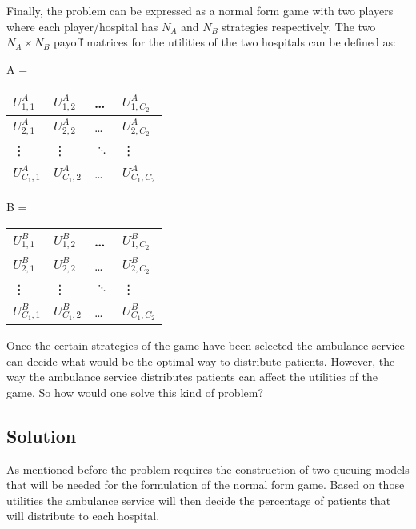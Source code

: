 Finally, the problem can be expressed as a normal form game with two players where 
each player/hospital has \( N_A \) and \( N_B \) strategies respectively. 
The two \( N_A \times N_B \) payoff matrices for the utilities of the two hospitals 
can be defined as:

\begin{table}[h]
    \centering
    \begin{minipage}{.5\linewidth}
        A = 
        \begin{tabular}{|l|l|l|l|}
            \hline
            \( U_{1,1}^A \) & \( U_{1,2}^A \) & \dots & \( U_{1,C_2}^A \) \\ \hline
            \( U_{2,1}^A \) & \( U_{2,2}^A \) & \dots & \( U_{2,C_2}^A \) \\ \hline
            \vdots & \vdots & \( \ddots \) & \vdots \\ \hline
            \( U_{C_1,1}^A \) & \( U_{C_1,2}^A \) & \dots & \( U_{C_1,C_2}^A \) \\ \hline
        \end{tabular}
    \end{minipage}%
    \begin{minipage}{.5\linewidth}
        B = 
        \begin{tabular}{|l|l|l|l|}
            \hline
            \( U_{1,1}^B \) & \( U_{1,2}^B \) & \dots & \( U_{1,C_2}^B \) \\ \hline
            \( U_{2,1}^B \) & \( U_{2,2}^B \) & \dots & \( U_{2,C_2}^B \) \\ \hline
            \vdots & \vdots & \( \ddots \) & \vdots \\ \hline
            \( U_{C_1,1}^B \) & \( U_{C_1,2}^B \) & \dots & \( U_{C_1,C_2}^B \) \\ \hline
        \end{tabular}
    \end{minipage}
\end{table}  
Once the certain strategies of the game have been selected the ambulance service 
can decide what would be the optimal way to distribute patients. 
However, the way the ambulance service distributes patients can affect the utilities 
of the game. So how would one solve this kind of problem?
 
\subsection{Solution}
As mentioned before the problem requires the construction of two queuing models 
that will be needed for the formulation of the normal form game. 
Based on those utilities the ambulance service will then decide the percentage of 
patients that will distribute to each hospital. 


